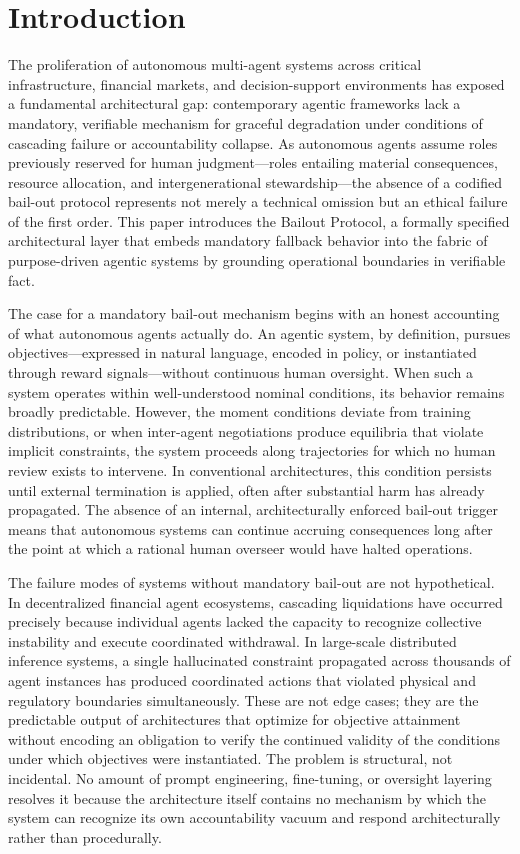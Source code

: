 \section{Introduction}

The proliferation of autonomous multi-agent systems across critical infrastructure, financial markets, and decision-support environments has exposed a fundamental architectural gap: contemporary agentic frameworks lack a mandatory, verifiable mechanism for graceful degradation under conditions of cascading failure or accountability collapse. As autonomous agents assume roles previously reserved for human judgment—roles entailing material consequences, resource allocation, and intergenerational stewardship—the absence of a codified bail-out protocol represents not merely a technical omission but an ethical failure of the first order. This paper introduces the \bxthree Bailout Protocol, a formally specified architectural layer that embeds mandatory fallback behavior into the fabric of purpose-driven agentic systems by grounding operational boundaries in verifiable fact.

The case for a mandatory bail-out mechanism begins with an honest accounting of what autonomous agents actually do. An agentic system, by definition, pursues objectives—expressed in natural language, encoded in policy, or instantiated through reward signals—without continuous human oversight. When such a system operates within well-understood nominal conditions, its behavior remains broadly predictable. However, the moment conditions deviate from training distributions, or when inter-agent negotiations produce equilibria that violate implicit constraints, the system proceeds along trajectories for which no human review exists to intervene. In conventional architectures, this condition persists until external termination is applied, often after substantial harm has already propagated. The absence of an internal, architecturally enforced bail-out trigger means that autonomous systems can continue accruing consequences long after the point at which a rational human overseer would have halted operations.

The failure modes of systems without mandatory bail-out are not hypothetical. In decentralized financial agent ecosystems, cascading liquidations have occurred precisely because individual agents lacked the capacity to recognize collective instability and execute coordinated withdrawal. In large-scale distributed inference systems, a single hallucinated constraint propagated across thousands of agent instances has produced coordinated actions that violated physical and regulatory boundaries simultaneously. These are not edge cases; they are the predictable output of architectures that optimize for objective attainment without encoding an obligation to verify the continued validity of the conditions under which objectives were instantiated. The problem is structural, not incidental. No amount of prompt engineering, fine-tuning, or oversight layering resolves it because the architecture itself contains no mechanism by which the system can recognize its own accountability vacuum and respond architecturally rather than procedurally.

